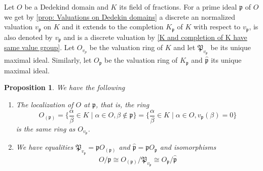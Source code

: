 \documentclass{article}
\newtheorem{proposition}{Proposition}[section]
\newcommand{\mfrak}[1]{\mathfrak{#1}}
\newcommand{\vp}{{v_{\mfrak p}}}
\numberwithin{equation}{section}
\begin{document}
Let $O$ be a Dedekind domain and $K$ its field of fractions. For a prime ideal $\mfrak p$ of $O$ we get by \cref{prop: Valuations on Dedekin domains} a discrete an normalized valuation $\vp$ on $K$ and it extends to the completion $K_\mfrak{p}$ of $K$ with respect to $v_\mfrak{p}$, is also denoted by $v_\mfrak{p}$ and is a discrete valuation by \cref{K and completion of K have same value group}. Let $O_{v_p}$ be the valuation ring of $K$ and let $\mfrak{P}_{v_\mfrak{p}}$ be its unique maximal ideal. Similarly, let $O_\mfrak{p}$ be the valuation ring of $K_\mfrak{p}$ and $\hat{\mfrak{p}}$ its unique maximal ideal.

\begin{proposition} \label{prop: Valuations on Dedekin domains properties}
    We have the following 
    \begin{enumerate}
        \item The localization of $O$ at $\mfrak p$, that is, the ring
              $$O_{(\mfrak p)} = \{\frac{\alpha}{\beta} \in K \mid \alpha \in O, \beta \notin \mfrak p\} =  \{\frac{\alpha}{\beta} \in K \mid \alpha \in O, \vp(\beta) = 0 \}$$
              is the same ring as $O_{\vp}$.
        \item We have equalities $\mfrak P_\vp = \mfrak p O_{(\mfrak p)}$ and $\hat {\mfrak p } = \mfrak p O_{\mfrak p}$ and isomorphisms
              $$
                  O / \mfrak{p} \cong O_{(\mfrak{p})} / \mfrak{P}_{v_{\mfrak{p}}} \cong O_{\mfrak{p}} / \hat{\mfrak{p}}
              $$

    \end{enumerate}

\end{proposition}
\end{document}
